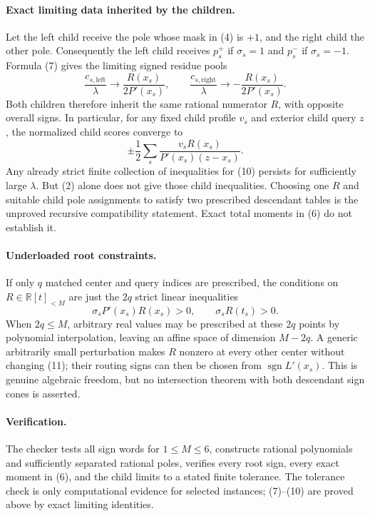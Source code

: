 \documentclass[11pt]{article}
\begin{document}
\paragraph{Exact limiting data inherited by the children.}
Let the left child receive the pole whose mask in (4) is $+1$, and
the right child the other pole. Consequently the left child receives
$p_s^+$ if $\sigma_s=1$ and $p_s^-$ if $\sigma_s=-1$. Formula (7)
gives the limiting signed residue pools
\[
 \frac{c_{s,\mathrm{left}}}{\lambda}
       \longrightarrow \frac{R(x_s)}{2P'(x_s)},\qquad
 \frac{c_{s,\mathrm{right}}}{\lambda}
       \longrightarrow -\frac{R(x_s)}{2P'(x_s)}.              \tag{9}
\]
Both children therefore inherit the same rational numerator $R$,
with opposite overall signs. In particular, for any fixed child
profile $v_s$ and exterior child query $z$, the normalized child
scores converge to
\[
       \pm\frac12\sum_s\frac{v_sR(x_s)}{P'(x_s)(z-x_s)}.
                                                               \tag{10}
\]
Any already strict finite collection of inequalities for (10)
persists for sufficiently large $\lambda$. But (2) alone does not
give those child inequalities. Choosing one $R$ and suitable child
pole assignments to satisfy two prescribed descendant tables is the
unproved recursive compatibility statement. Exact total moments in
(6) do not establish it.

\paragraph{Underloaded root constraints.}
If only $q$ matched center and query indices are prescribed, the
conditions on $R\in\mathbb R[t]_{<M}$ are just the $2q$ strict
linear inequalities
\[
            \sigma_sP'(x_s)R(x_s)>0,\qquad
            \sigma_sR(t_s)>0.                               \tag{11}
\]
When $2q\leq M$, arbitrary real values may be prescribed at these
$2q$ points by polynomial interpolation, leaving an affine space of
dimension $M-2q$. A generic arbitrarily small perturbation makes
$R$ nonzero at every other center without changing (11); their
routing signs can then be chosen from $\operatorname{sgn}L'(x_s)$.
This is genuine algebraic freedom, but no intersection theorem with
both descendant sign cones is asserted.

\paragraph{Verification.}
The checker tests all sign words for $1\leq M\leq6$, constructs
rational polynomials and sufficiently separated rational poles,
verifies every root sign, every exact moment in (6), and the child
limits to a stated finite tolerance. The tolerance check is only
computational evidence for selected instances; (7)--(10) are proved
above by exact limiting identities.
\end{document}
